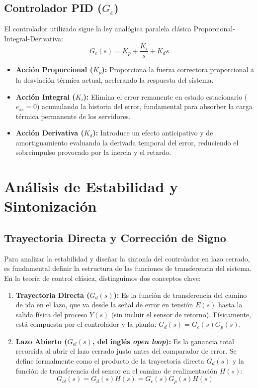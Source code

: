 \documentclass[journal,twocolumn]{IEEEtran}
\begin{document}
\subsection{Controlador PID ($G_c$)}
El controlador utilizado sigue la ley analógica paralela clásica Proporcional-Integral-Derivativa:
\begin{equation}
    G_c(s) = K_p + \frac{K_i}{s} + K_d s
\end{equation}
\begin{itemize}
    \item \textbf{Acción Proporcional ($K_p$):} Proporciona la fuerza correctora proporcional a la desviación térmica actual, acelerando la respuesta del sistema.
    \item \textbf{Acción Integral ($K_i$):} Elimina el error remanente en estado estacionario ($e_{ss} = 0$) acumulando la historia del error, fundamental para absorber la carga térmica permanente de los servidores.
    \item \textbf{Acción Derivativa ($K_d$):} Introduce un efecto anticipativo y de amortiguamiento evaluando la derivada temporal del error, reduciendo el sobreimpulso provocado por la inercia y el retardo.
\end{itemize}

\section{Análisis de Estabilidad y Sintonización}

\subsection{Trayectoria Directa y Corrección de Signo}
Para analizar la estabilidad y diseñar la sintonía del controlador en lazo cerrado, es fundamental definir la estructura de las funciones de transferencia del sistema. En la teoría de control clásica, distinguimos dos conceptos clave:
\begin{enumerate}
    \item \textbf{Trayectoria Directa ($G_d(s)$):} Es la función de transferencia del camino de ida en el lazo, que va desde la señal de error en tensión $E(s)$ hasta la salida física del proceso $Y(s)$ (sin incluir el sensor de retorno). Físicamente, está compuesta por el controlador y la planta: $G_d(s) = G_c(s) G_p(s)$.
    \item \textbf{Lazo Abierto ($G_{ol}(s)$, del inglés \textit{open loop}):} Es la ganancia total recorrida al abrir el lazo cerrado justo antes del comparador de error. Se define formalmente como el producto de la trayectoria directa $G_d(s)$ y la función de transferencia del sensor en el camino de realimentación $H(s)$:
    \begin{equation}
        G_{ol}(s) = G_d(s) H(s) = G_c(s) G_p(s) H(s)
    \end{equation}
\end{enumerate}
\end{document}
